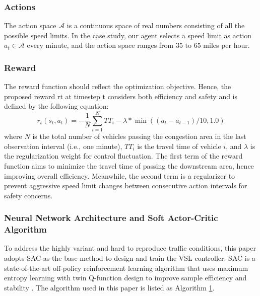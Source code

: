\documentclass[11pt, letterpaper]{article}
\begin{document}
\subsubsection{Actions}

The action space $\mathcal{A}$ is a continuous space of real numbers consisting of all the possible speed limits. In the case study, our agent selects a speed limit as action $a_t\in\mathcal{A}$ every minute, and the action space ranges from 35 to 65 miles per hour.

\subsubsection{Reward}

The reward function should reflect the optimization objective. Hence, the proposed reward rt at timestep t considers both efficiency and safety and is defined by the following equation:
\begin{equation}
    r_t(s_t, a_t)= -\frac{1}{N}\sum_{i=1}^NTT_i - \lambda * \min\left((a_t - a_{t-1}) / 10, 1.0\right)
\end{equation}
where $N$ is the total number of vehicles passing the congestion area in the last observation interval (i.e., one minute), $TT_i$ is the travel time of vehicle $i$, and $\lambda$ is the regularization weight for control fluctuation. The first term of the reward function aims to minimize the travel time of passing the downstream area, hence improving overall efficiency. Meanwhile, the second term is a regularizer to prevent aggressive speed limit changes between consecutive action intervals for safety concerns.

\subsubsection{Neural Network Architecture and Soft Actor-Critic Algorithm}

To address the highly variant and hard to reproduce traffic conditions, this paper adopts SAC as the base method to design and train the VSL controller. SAC is a state-of-the-art off-policy reinforcement learning algorithm that uses maximum entropy learning with twin Q-function design to improve sample efficiency and stability \citep{pmlr-v80-haarnoja18b}. The algorithm used in this paper is listed as Algorithm \hyperref[alg:1]{1}.
\end{document}
